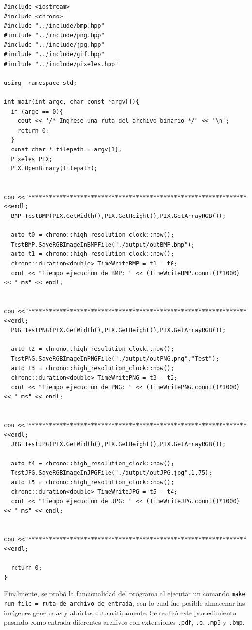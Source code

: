 \begin{verbatim}
#include <iostream>
#include <chrono>
#include "../include/bmp.hpp"
#include "../include/png.hpp"
#include "../include/jpg.hpp"
#include "../include/gif.hpp"
#include "../include/pixeles.hpp"

using  namespace std;

int main(int argc, char const *argv[]){
  if (argc == 0){
    cout << "/* Ingrese una ruta del archivo binario */" << '\n';
    return 0;
  }
  const char * filepath = argv[1];
  Pixeles PIX;
  PIX.OpenBinary(filepath);

  cout<<"***************************************************************"<<endl;
  BMP TestBMP(PIX.GetWidth(),PIX.GetHeight(),PIX.GetArrayRGB());

  auto t0 = chrono::high_resolution_clock::now();
  TestBMP.SaveRGBImageInBMPFile("./output/outBMP.bmp");
  auto t1 = chrono::high_resolution_clock::now();
  chrono::duration<double> TimeWriteBMP = t1 - t0;
  cout << "Tiempo ejecución de BMP: " << (TimeWriteBMP.count()*1000) << " ms" << endl;

  cout<<"***************************************************************"<<endl;
  PNG TestPNG(PIX.GetWidth(),PIX.GetHeight(),PIX.GetArrayRGB());

  auto t2 = chrono::high_resolution_clock::now();
  TestPNG.SaveRGBImageInPNGFile("./output/outPNG.png","Test");
  auto t3 = chrono::high_resolution_clock::now();
  chrono::duration<double> TimeWritePNG = t3 - t2;
  cout << "Tiempo ejecución de PNG: " << (TimeWritePNG.count()*1000) << " ms" << endl;

  cout<<"***************************************************************"<<endl;
  JPG TestJPG(PIX.GetWidth(),PIX.GetHeight(),PIX.GetArrayRGB());

  auto t4 = chrono::high_resolution_clock::now();
  TestJPG.SaveRGBImageInJPGFile("./output/outJPG.jpg",1,75);
  auto t5 = chrono::high_resolution_clock::now();
  chrono::duration<double> TimeWriteJPG = t5 - t4;
  cout << "Tiempo ejecución de JPG: " << (TimeWriteJPG.count()*1000) << " ms" << endl;

  cout<<"***************************************************************"<<endl;

  return 0;
}
\end{verbatim}

Finalmente, se probó la funcionalidad del programa al ejecutar un comando \texttt{make run file = ruta\_de\_archivo\_de\_entrada}, con lo cual fue posible almacenar las imágenes generadas y abrirlas automáticamente. Se realizó este procedimiento pasando como entrada diferentes archivos con extensiones \texttt{.pdf}, \texttt{.o}, \texttt{.mp3} y \texttt{.bmp}.

